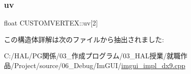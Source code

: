\mbox{\label{struct_c_u_s_t_o_m_v_e_r_t_e_x_a2c27e901db37bc828fb408010596304c}} 
\subsubsection{\texorpdfstring{uv}{uv}}
{\footnotesize\ttfamily float C\+U\+S\+T\+O\+M\+V\+E\+R\+T\+E\+X\+::uv\mbox{[}2\mbox{]}}



この構造体詳解は次のファイルから抽出されました\+:\begin{DoxyCompactItemize}
\item 
C\+:/\+H\+A\+L/\+P\+G関係/03\+\_\+作成プログラム/03\+\_\+\+H\+A\+L授業/就職作品/\+Project/source/06\+\_\+\+Debug/\+Im\+G\+U\+I/\mbox{\hyperlink{imgui__impl__dx9_8cpp}{imgui\+\_\+impl\+\_\+dx9.\+cpp}}\end{DoxyCompactItemize}
